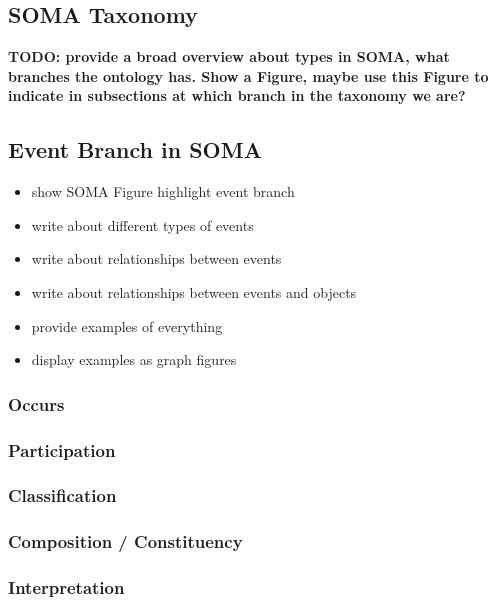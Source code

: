 \subsection{SOMA Taxonomy}
\label{sec:narrative:taxonomy}

\textbf{TODO: provide a broad overview about types in SOMA, what branches the ontology has. Show a Figure, maybe use this Figure to indicate in subsections at which branch in the taxonomy we are?}

\subsection{Event Branch in SOMA}
\begin{itemize}
\item show SOMA Figure highlight event branch
\item write about different types of events
\item write about relationships between events
\item write about relationships between events and objects
\item provide examples of everything
\item display examples as graph figures
\end{itemize}

\subsubsection{Occurs}
\subsubsection{Participation}
\subsubsection{Classification}
\subsubsection{Composition / Constituency}
\subsubsection{Interpretation}



